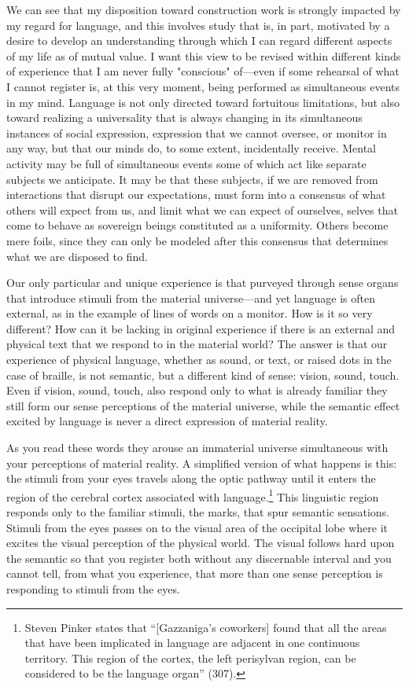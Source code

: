 \documentclass[
]{memoir}
\begin{document}
We can see that my disposition toward construction work is strongly
impacted by my regard for language, and this involves study that is, in
part, motivated by a desire to develop an understanding through which I
can regard different aspects of my life as of mutual value. I want this
view to be revised within different kinds of experience that I am never
fully "conscious" of---even if some rehearsal of what I cannot register
is, at this very moment, being performed as simultaneous events in my
mind. Language is not only directed toward fortuitous limitations, but
also toward realizing a universality that is always changing in its
simultaneous instances of social expression, expression that we cannot
oversee, or monitor in any way, but that our minds do, to some extent,
incidentally receive. Mental activity may be full of simultaneous events
some of which act like separate subjects we anticipate. It may be that
these subjects, if we are removed from interactions that disrupt our
expectations, must form into a consensus of what others will expect from
us, and limit what we can expect of ourselves, selves that come to
behave as sovereign beings constituted as a uniformity. Others become
mere foils, since they can only be modeled after this consensus that
determines what we are disposed to find.

Our only particular and unique experience is that purveyed through sense
organs that introduce stimuli from the material universe---and yet
language is often external, as in the example of lines of words on a
monitor. How is it so very different? How can it be lacking in original
experience if there is an external and physical text that we respond to
in the material world? The answer is that our experience of physical
language, whether as sound, or text, or raised dots in the case of
braille, is not semantic, but a different kind of sense: vision, sound,
touch. Even if vision, sound, touch, also respond only to what is
already familiar they still form our sense perceptions of the material
universe, while the semantic effect excited by language is never a
direct expression of material reality.

As you read these words they arouse an immaterial universe simultaneous
with your perceptions of material reality. A simplified version of what
happens is this: the stimuli from your eyes travels along the optic
pathway until it enters the region of the cerebral cortex associated
with language.\footnote{Steven Pinker states that ``{[}Gazzaniga's
  coworkers{]} found that all the areas that have been implicated in
  language are adjacent in one continuous territory. This region of the
  cortex, the left perisylvan region, can be considered to be the
  language organ'' (307).} This linguistic region responds only to the
familiar stimuli, the marks, that spur semantic sensations. Stimuli from
the eyes passes on to the visual area of the occipital lobe where it
excites the visual perception of the physical world. The visual follows
hard upon the semantic so that you register both without any discernable
interval and you cannot tell, from what you experience, that more than
one sense perception is responding to stimuli from the eyes.
\end{document}
